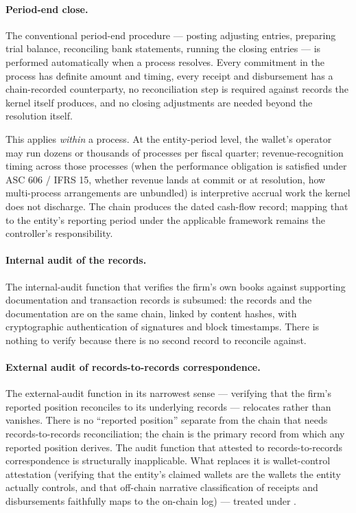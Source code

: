 \documentclass[11pt,a4paper]{article}
\theoremstyle{definition}
\theoremstyle{remark}
\begin{document}
\paragraph{Period-end close.}
The conventional period-end procedure --- posting adjusting
entries, preparing trial balance, reconciling bank statements,
running the closing entries --- is performed automatically
when a process resolves. Every commitment in the process has
definite amount and timing, every receipt and disbursement has
a chain-recorded counterparty, no reconciliation step is
required against records the kernel itself produces, and no
closing adjustments are needed beyond the resolution itself.

This applies \emph{within} a process. At the entity-period
level, the wallet's operator may run dozens or thousands of
processes per fiscal quarter; revenue-recognition timing
across those processes (when the performance obligation is
satisfied under ASC 606 / IFRS 15, whether revenue lands at
commit or at resolution, how multi-process arrangements are
unbundled) is interpretive accrual work the kernel does not
discharge. The chain produces the dated cash-flow record;
mapping that to the entity's reporting period under the
applicable framework remains the controller's responsibility.

\paragraph{Internal audit of the records.}
The internal-audit function that verifies the firm's own books
against supporting documentation and transaction records is
subsumed: the records and the documentation are on the same
chain, linked by content hashes, with cryptographic
authentication of signatures and block timestamps. There is
nothing to verify because there is no second record to
reconcile against.

\paragraph{External audit of records-to-records correspondence.}
The external-audit function in its narrowest sense ---
verifying that the firm's reported position reconciles to its
underlying records --- relocates rather than vanishes. There
is no ``reported position'' separate from the chain that
needs records-to-records reconciliation; the chain is the
primary record from which any reported position derives. The
audit function that attested to records-to-records
correspondence is structurally inapplicable. What replaces it
is wallet-control attestation (verifying that the entity's
claimed wallets are the wallets the entity actually controls,
and that off-chain narrative classification of receipts and
disbursements faithfully maps to the on-chain log) ---
treated under .
\end{document}
